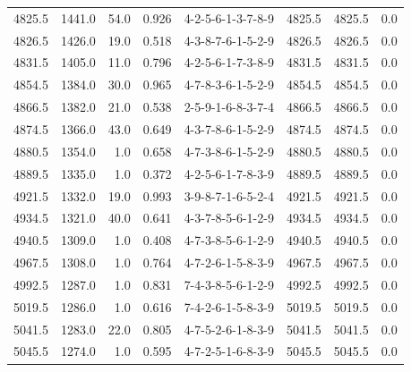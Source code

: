 \begin{tabular}{rrrrlrrr}
 4825.5 &  1441.0 &           54.0 &              0.926 &  4-2-5-6-1-3-7-8-9 &        4825.5 &          4825.5 &       0.0 \\
 4826.5 &  1426.0 &           19.0 &              0.518 &  4-3-8-7-6-1-5-2-9 &        4826.5 &          4826.5 &       0.0 \\
 4831.5 &  1405.0 &           11.0 &              0.796 &  4-2-5-6-1-7-3-8-9 &        4831.5 &          4831.5 &       0.0 \\
 4854.5 &  1384.0 &           30.0 &              0.965 &  4-7-8-3-6-1-5-2-9 &        4854.5 &          4854.5 &       0.0 \\
 4866.5 &  1382.0 &           21.0 &              0.538 &  2-5-9-1-6-8-3-7-4 &        4866.5 &          4866.5 &       0.0 \\
 4874.5 &  1366.0 &           43.0 &              0.649 &  4-3-7-8-6-1-5-2-9 &        4874.5 &          4874.5 &       0.0 \\
 4880.5 &  1354.0 &            1.0 &              0.658 &  4-7-3-8-6-1-5-2-9 &        4880.5 &          4880.5 &       0.0 \\
 4889.5 &  1335.0 &            1.0 &              0.372 &  4-2-5-6-1-7-8-3-9 &        4889.5 &          4889.5 &       0.0 \\
 4921.5 &  1332.0 &           19.0 &              0.993 &  3-9-8-7-1-6-5-2-4 &        4921.5 &          4921.5 &       0.0 \\
 4934.5 &  1321.0 &           40.0 &              0.641 &  4-3-7-8-5-6-1-2-9 &        4934.5 &          4934.5 &       0.0 \\
 4940.5 &  1309.0 &            1.0 &              0.408 &  4-7-3-8-5-6-1-2-9 &        4940.5 &          4940.5 &       0.0 \\
 4967.5 &  1308.0 &            1.0 &              0.764 &  4-7-2-6-1-5-8-3-9 &        4967.5 &          4967.5 &       0.0 \\
 4992.5 &  1287.0 &            1.0 &              0.831 &  7-4-3-8-5-6-1-2-9 &        4992.5 &          4992.5 &       0.0 \\
 5019.5 &  1286.0 &            1.0 &              0.616 &  7-4-2-6-1-5-8-3-9 &        5019.5 &          5019.5 &       0.0 \\
 5041.5 &  1283.0 &           22.0 &              0.805 &  4-7-5-2-6-1-8-3-9 &        5041.5 &          5041.5 &       0.0 \\
 5045.5 &  1274.0 &            1.0 &              0.595 &  4-7-2-5-1-6-8-3-9 &        5045.5 &          5045.5 &       0.0 \\

\end{tabular}
